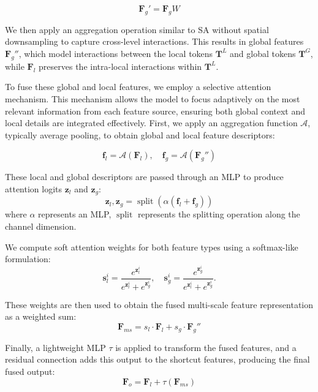 \begin{equation}
	\mathbf{F}_g' = \mathbf{F}_g W
\end{equation}

We then apply an aggregation operation similar to SA without spatial downsampling to capture cross-level interactions. This results in global features $\mathbf{F}_g''$, which model interactions between the local tokens $\mathbf{T}^{L}$ and global tokens $\mathbf{T}^{G}$, while $\mathbf{F}_l$ preserves the intra-local interactions within $\mathbf{T}^{L}$.

To fuse these global and local features, we employ a selective attention mechanism. This mechanism allows the model to focus adaptively on the most relevant information from each feature source, ensuring both global context and local details are integrated effectively. First, we apply an aggregation function $\mathcal{A}$, typically average pooling, to obtain global and local feature descriptors:

\begin{equation}
	\mathbf{f}_l = \mathcal{A}(\mathbf{F}_l), \quad \mathbf{f}_g = \mathcal{A}(\mathbf{F}_g'')
\end{equation}

These local and global descriptors are passed through an MLP to produce attention logits $\mathbf{z}_l$ and $\mathbf{z}_g$:
\begin{equation}
	\mathbf{z}_l, \mathbf{z}_g = \operatorname{split}\left( \alpha \left( \mathbf{f}_l + \mathbf{f}_g \right) \right)
\end{equation}
where $\alpha$ represents an MLP, $\operatorname{split}$ represents the splitting operation along the channel dimension.

We compute soft attention weights for both feature types using a softmax-like formulation:
\begin{equation}
	\mathbf{s}_l^i = \frac{e^{\mathbf{z}_l^i}}{e^{\mathbf{z}_l^i} + e^{\mathbf{z}_g^i}}, \quad
\mathbf{s}_g^i = \frac{e^{\mathbf{z}_g^i}}{e^{\mathbf{z}_l^i} + e^{\mathbf{z}_g^i}}.
\end{equation}

These weights are then used to obtain the fused multi-scale feature representation as a weighted sum:
\begin{equation}
	\mathbf{F}_{ms} = s_l \cdot \mathbf{F}_l + s_g \cdot \mathbf{F}_g''
\end{equation}

Finally, a lightweight MLP $\tau$ is applied to transform the fused features, and a residual connection adds this output to the shortcut features, producing the final fused output:
\begin{equation}
	\mathbf{F}_o = \mathbf{F}_l + \tau(\mathbf{F}_{ms})
\end{equation}

